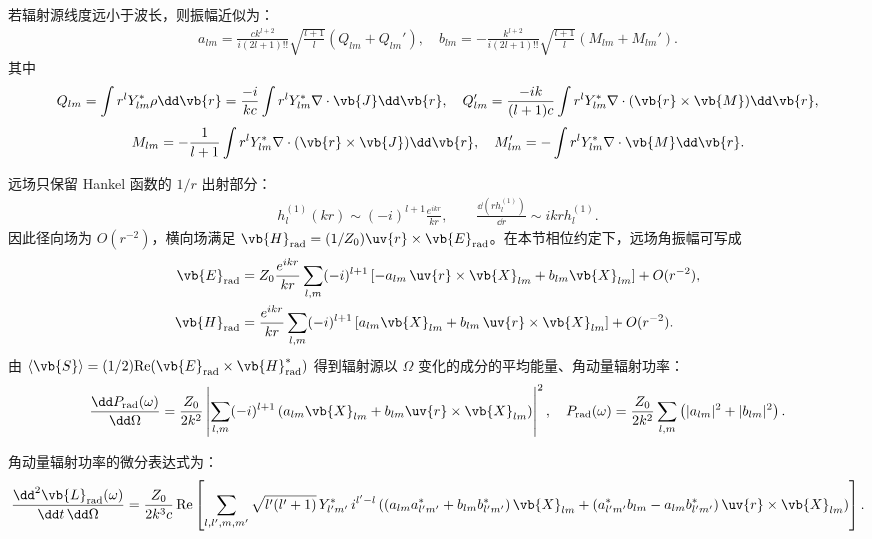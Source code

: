 若辐射源线度远小于波长，则振幅近似为：
\begin{align*}
	a_{lm} = \frac{c k^{l+2}}{i (2l+1)!!} \sqrt{\frac{l+1}{l}} (Q_{lm} + Q_{lm}'),\quad
	b_{lm} = -\frac{k^{l+2}}{i (2l+1)!!} \sqrt{\frac{l+1}{l}} (M_{lm} + M_{lm}').
\end{align*}
其中
\begin{align*}
	Q_{lm} = \int r^l Y_{lm}^\ast \rho \dd \vb{r} = \frac{-i}{k c} \int r^l Y_{lm}^\ast \nabla \cdot \vb{J} \dd \vb{r},\quad
	Q_{lm}' = \frac{-i k}{(l+1) c} \int r^l Y_{lm}^\ast \nabla \cdot (\vb{r} \times \vb{M}) \dd \vb{r},
\end{align*}
\begin{align*}
	M_{lm} = -\frac{1}{l+1} \int r^l Y_{lm}^\ast \nabla \cdot (\vb{r} \times \vb{J}) \dd \vb{r},\quad
	M_{lm}' = -\int r^l Y_{lm}^\ast \nabla \cdot \vb{M} \dd \vb{r}.
\end{align*}

远场只保留 Hankel 函数的 \(1/r\) 出射部分：
\begin{align*}
	h_l^{(1)}(kr)\sim (-i)^{l+1}\frac{e^{ikr}}{kr},\qquad
	\frac{\dd (r h_l^{(1)})}{\dd r}\sim i k r h_l^{(1)} .
\end{align*}
因此径向场为 \(O(r^{-2})\)，横向场满足 \(\vb{H}_{\mathrm{rad}}=(1/Z_0)\uv{r}\times\vb{E}_{\mathrm{rad}}\)。在本节相位约定下，远场角振幅可写成
\begin{align*}
	\vb{E}_{\mathrm{rad}}
	&=Z_0\frac{e^{ikr}}{kr}
	\sum_{l,m}(-i)^{l+1}\left[-a_{lm}\,\uv{r}\times\vb{X}_{lm}+b_{lm}\vb{X}_{lm}\right]+O(r^{-2}),\\
	\vb{H}_{\mathrm{rad}}
	&=\frac{e^{ikr}}{kr}
	\sum_{l,m}(-i)^{l+1}\left[a_{lm}\vb{X}_{lm}+b_{lm}\,\uv{r}\times\vb{X}_{lm}\right]+O(r^{-2}).
\end{align*}
由 \(\langle\vb{S}\rangle=(1/2)\mathrm{Re}(\vb{E}_{\mathrm{rad}}\times\vb{H}_{\mathrm{rad}}^\ast)\) 得到辐射源以 \(\Omega\) 变化的成分的平均能量、角动量辐射功率：
\begin{align*}
	\frac{\dd P_{\text{rad}}(\omega)}{\dd \Omega} = \frac{Z_0}{2k^2} \left| \sum_{l,m}(-i)^{l+1} \left( a_{lm} \vb{X}_{lm} + b_{lm} \uv{r} \times \vb{X}_{lm} \right) \right|^2,\quad
	P_{\text{rad}}(\omega) = \frac{Z_0}{2k^2} \sum_{l,m} \left( |a_{lm}|^2 + |b_{lm}|^2 \right).
\end{align*}

角动量辐射功率的微分表达式为：
\begin{align*}
	\frac{\dd^2 \vb{L}_{\text{rad}}(\omega)}{\dd t \, \dd \Omega} = \frac{Z_0}{2k^3 c} \, \text{Re} \left[ \sum_{l,l',m,m'} \sqrt{l'(l' + 1)} \, Y_{l'm'}^\ast \, i^{l' - l}\left( \left( a_{lm} a_{l'm'}^\ast + b_{lm} b_{l'm'}^\ast \right) \vb{X}_{lm} + \left( a_{l'm'}^\ast b_{lm} - a_{lm} b_{l'm'}^\ast \right) \uv{r} \times \vb{X}_{lm}	\right) \right].
\end{align*}

